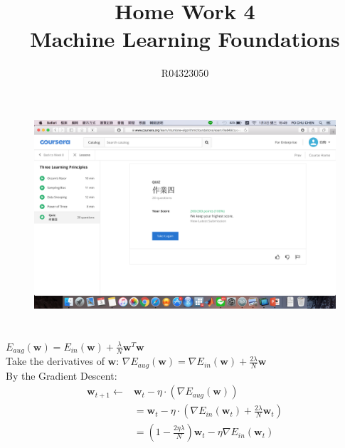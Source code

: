 \documentclass[a4paper,12pt]{article}
\title{Home Work 4\\ Machine Learning Foundations}
\author{R04323050 \\{\McQ\cH37}\z{\MbQ\cH200}\z{\MmQ\cH238}\z{\McQ\cH250}   \quad {\McQ\cH207}\z{\MdQ\cH43}\z{\MjQ\cH254}}
\date{}
\begin{document}
\maketitle
\section{}
\begin{figure}[h]
\centering
\includegraphics[scale=0.38]{Q1.png}
\end{figure}

\newpage

\section{}
$\displaystyle E_{aug}(\mathbf{w})=E_{in}(\mathbf{w})+ \frac{\lambda}{N} \mathbf{w}^{T} \mathbf{w}$ \\
Take the derivatives of $\displaystyle \mathbf{w}$: $\nabla E_{aug}(\mathbf{w})= \nabla E_{in}(\mathbf{w}) + \frac{2 \lambda}{N} \mathbf{w}$ \\
By the Gradient Descent: 
\begin{align*} 
 \mathbf{w}_{t+1} \leftarrow &\mathbf{w}_{t} - \eta \cdot (\nabla E_{aug}(\mathbf{w})) \\
  &= \mathbf{w}_{t} - \eta \cdot (\nabla E_{in}(\mathbf{w}_{t}) + \frac{2 \lambda}{N} \mathbf{w}_{t}) \\
  &= (1- \frac{2 \eta \lambda}{N}) \mathbf{w}_{t} - \eta \nabla E_{in}(\mathbf{w}_{t})
\end{align*}
\end{document}
